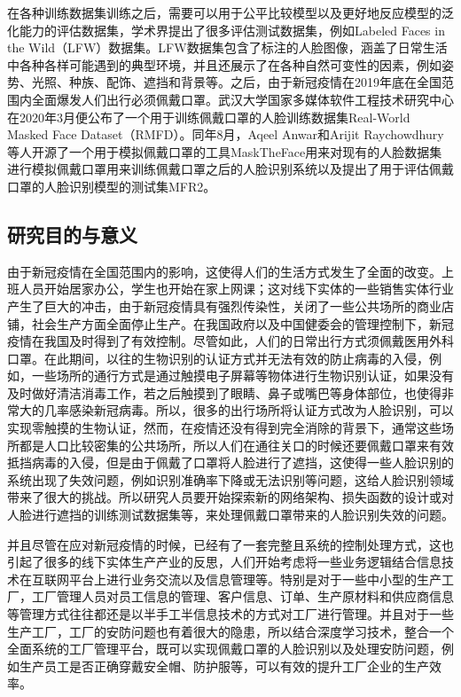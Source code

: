 在各种训练数据集训练之后，需要可以用于公平比较模型以及更好地反应模型的泛化能力的评估数据集，学术界提出了很多评估测试数据集，例如Labeled Faces in the Wild（LFW\cite{lfw}）数据集。LFW数据集包含了标注的人脸图像，涵盖了日常生活中各种各样可能遇到的典型环境，并且还展示了在各种自然可变性的因素，例如姿势、光照、种族、配饰、遮挡和背景等。之后，由于新冠疫情在2019年底在全国范围内全面爆发人们出行必须佩戴口罩。武汉大学国家多媒体软件工程技术研究中心在2020年3月便公布了一个用于训练佩戴口罩的人脸训练数据集Real-World Masked Face Dataset（RMFD\cite{wuhanmasked}）。同年8月，Aqeel Anwar和Arijit Raychowdhury等人开源了一个用于模拟佩戴口罩的工具MaskTheFace\cite{masktheface}用来对现有的人脸数据集进行模拟佩戴口罩用来训练佩戴口罩之后的人脸识别系统以及提出了用于评估佩戴口罩的人脸识别模型的测试集MFR2。

\subsection{研究目的与意义}

由于新冠疫情在全国范围内的影响，这使得人们的生活方式发生了全面的改变。上班人员开始居家办公，学生也开始在家上网课；这对线下实体的一些销售实体行业产生了巨大的冲击，由于新冠疫情具有强烈传染性，关闭了一些公共场所的商业店铺，社会生产方面全面停止生产。在我国政府以及中国健委会的管理控制下，新冠疫情在我国及时得到了有效控制。尽管如此，人们的日常出行方式须佩戴医用外科口罩。在此期间，以往的生物识别的认证方式并无法有效的防止病毒的入侵，例如，一些场所的通行方式是通过触摸电子屏幕等物体进行生物识别认证，如果没有及时做好清洁消毒工作，若之后触摸到了眼睛、鼻子或嘴巴等身体部位，也使得非常大的几率感染新冠病毒。所以，很多的出行场所将认证方式改为人脸识别，可以实现零触摸的生物认证，然而，在疫情还没有得到完全消除的背景下，通常这些场所都是人口比较密集的公共场所，所以人们在通往关口的时候还要佩戴口罩来有效抵挡病毒的入侵，但是由于佩戴了口罩将人脸进行了遮挡，这使得一些人脸识别的系统出现了失效问题，例如识别准确率下降或无法识别等问题，这给人脸识别领域带来了很大的挑战。所以研究人员要开始探索新的网络架构、损失函数的设计或对人脸进行遮挡的训练测试数据集等，来处理佩戴口罩带来的人脸识别失效的问题。

并且尽管在应对新冠疫情的时候，已经有了一套完整且系统的控制处理方式，这也引起了很多的线下实体生产产业的反思，人们开始考虑将一些业务逻辑结合信息技术在互联网平台上进行业务交流以及信息管理等。特别是对于一些中小型的生产工厂，工厂管理人员对员工信息的管理、客户信息、订单、生产原材料和供应商信息等管理方式往往都还是以半手工半信息技术的方式对工厂进行管理。并且对于一些生产工厂，工厂的安防问题也有着很大的隐患，所以结合深度学习技术，整合一个全面系统的工厂管理平台，既可以实现佩戴口罩的人脸识别以及处理安防问题，例如生产员工是否正确穿戴安全帽、防护服等，可以有效的提升工厂企业的生产效率。

